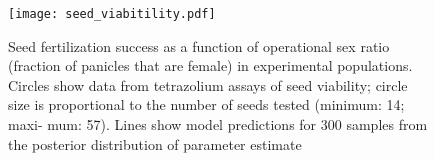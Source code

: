 \documentclass[9pt,twoside,lineno]{pnas-new}
\begin{document}

\begin{figure}
 \centering
  \texttt{[image: seed\_viabitility.pdf]}
  \caption{Seed fertilization success as a function of operational sex ratio (fraction of panicles that are female) in experimental populations. Circles show data from tetrazolium assays of seed viability; circle size is proportional to the number of seeds tested (minimum: 14; maxi- mum: 57). Lines show model predictions  for 300 samples from the posterior distribution of parameter estimate  }
  \label{Sup:seed_ORS}
 \end{figure}
\clearpage
\end{document}
